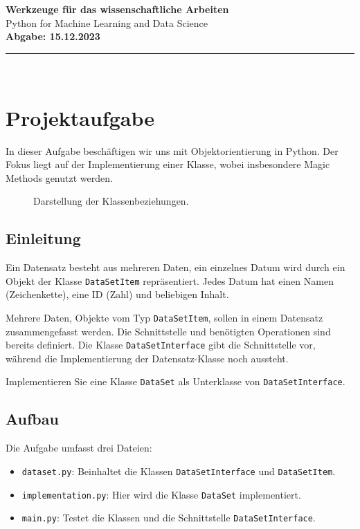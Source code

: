 \documentclass[a4paper, 12pt]{article}
\begin{document}
\begin{titlepage}
    \centering
    {\LARGE \textbf{Werkzeuge für das wissenschaftliche Arbeiten}}\\[1.5em]
    {\Large Python for Machine Learning and Data Science}\\[3em]
    \textbf{Abgabe: 15.12.2023}\\[2em]
    \rule{\textwidth}{0.4pt}\\[0.2cm]
    \vfill
\end{titlepage}

\tableofcontents
\newpage

\section{Projektaufgabe}
In dieser Aufgabe beschäftigen wir uns mit Objektorientierung in Python. Der Fokus liegt auf der Implementierung einer Klasse, wobei insbesondere Magic Methods genutzt werden.

\begin{figure}[h!]
    \centering
    
    \caption{Darstellung der Klassenbeziehungen.}
    \label{fig:classes}
\end{figure}

\subsection{Einleitung}
Ein Datensatz besteht aus mehreren Daten, ein einzelnes Datum wird durch ein Objekt der Klasse \texttt{DataSetItem} repräsentiert. Jedes Datum hat einen Namen (Zeichenkette), eine ID (Zahl) und beliebigen Inhalt.

Mehrere Daten, Objekte vom Typ \texttt{DataSetItem}, sollen in einem Datensatz zusammengefasst werden. Die Schnittstelle und benötigten Operationen sind bereits definiert. Die Klasse \texttt{DataSetInterface} gibt die Schnittstelle vor, während die Implementierung der Datensatz-Klasse noch aussteht.

Implementieren Sie eine Klasse \texttt{DataSet} als Unterklasse von \texttt{DataSetInterface}.

\subsection{Aufbau}
Die Aufgabe umfasst drei Dateien:
\begin{itemize}[noitemsep]
    \item \texttt{dataset.py}: Beinhaltet die Klassen \texttt{DataSetInterface} und \texttt{DataSetItem}.
    \item \texttt{implementation.py}: Hier wird die Klasse \texttt{DataSet} implementiert.
    \item \texttt{main.py}: Testet die Klassen und die Schnittstelle \texttt{DataSetInterface}.
\end{itemize}
\end{document}

